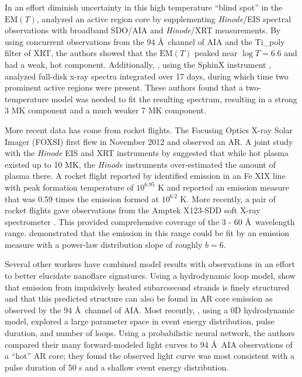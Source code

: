 \documentclass[apj]{emulateapj}
\newcommand{\ang}{\AA~}
\begin{document}
	\par In an effort diminish uncertainty in this high temperature ``blind spot'' in the $\mathrm{EM}(T)$, \citet{petralia_thermal_2014} analyzed an active region core by supplementing \textit{Hinode}/EIS spectral observations with broadband SDO/AIA and \textit{Hinode}/XRT measurements. By using concurrent observations from the 94 \ang channel of AIA and the Ti\_poly filter of XRT, the authors showed that the $\mathrm{EM}(T)$ peaked near $\log{T}=6.6$ and had a weak, hot component. Additionally, \citet{miceli_x-ray_2012}, using the SphinX instrument \citep{sylwester_sphinx:_2008,gburek_sphinx_2011}, analyzed full-disk x-ray spectra integrated over 17 days, during which time two prominent active regions were present. These authors found that a two-temperature model was needed to fit the resulting spectrum, resulting in a strong 3 MK component and a much weaker 7 MK component.
%
	\par More recent data has come from rocket flights. The Focusing Optics X-ray Solar Imager (FOXSI) \citep{krucker_focusing_2011} first flew in November 2012 and observed an AR. A joint study with the \textit{Hinode} EIS and XRT instruments by \citet{ishikawa_constraining_2014} suggested that while hot plasma existed up to 10 MK, the \textit{Hinode} instruments over-estimated the amount of plasma there. A rocket flight reported by \citet{brosius_pervasive_2014} identified emission in an Fe XIX line with peak formation temperature of $10^{6.95}$ K and reported an emission measure that was 0.59 times the emission formed at $10^{6.2}$ K. More recently, a pair of rocket flights gave observations from the Amptek X123-SDD soft X-ray spectrometer \citep{caspi_new_2015}. This provided comprehensive coverage of the 3 - 60 \ang wavelength range. \citeauthor{caspi_new_2015} demonstrated that the emission in this range could be fit by an emission measure with a power-law distribution slope of roughly $b = 6$. 
%
	\par Several other workers have combined model results with observations in an effort to better elucidate nanoflare signatures. Using a hydrodynamic loop model, \citet{reale_solar_2011} show that emission from impulsively heated subarcsecond strands is finely structured and that this predicted structure can also be found in AR core emission as observed by the 94 \ang channel of AIA. Most recently, \citet{tajfirouze_time-resolved_2016}, using a 0D hydrodynamic model, explored a large parameter space in event energy distribution, pulse duration, and number of loops. Using a probabilistic neural network, the authors compared their many forward-modeled light curves to 94 \ang AIA observations of a ``hot'' AR core; they found the observed light curve was most consistent with a pulse duration of 50 s and a shallow event energy distribution.
\end{document}
